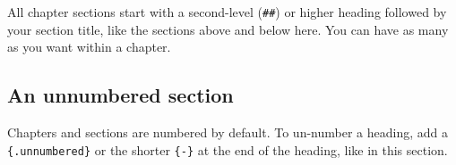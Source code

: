 \documentclass[
]{book}
\begin{document}
All chapter sections start with a second-level (\texttt{\#\#}) or higher heading followed by your section title, like the sections above and below here. You can have as many as you want within a chapter.

\subsection*{An unnumbered section}\label{an-unnumbered-section}

Chapters and sections are numbered by default. To un-number a heading, add a \texttt{\{.unnumbered\}} or the shorter \texttt{\{-\}} at the end of the heading, like in this section.


\end{document}
